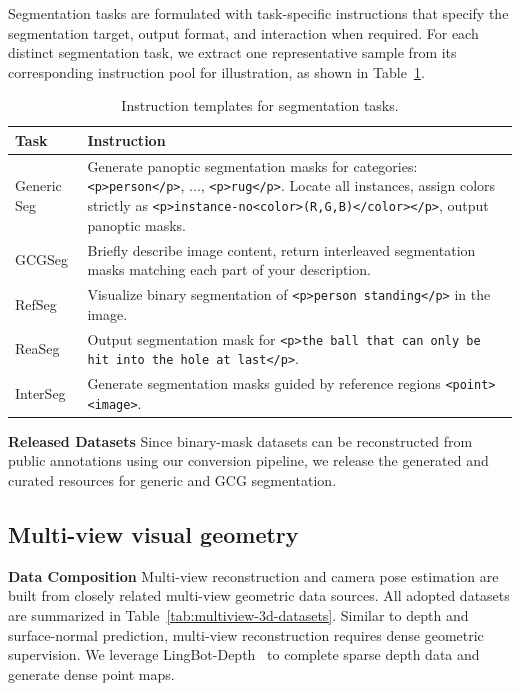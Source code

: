 Segmentation tasks are formulated with task-specific instructions that specify the segmentation target, output format, and interaction when required.
For each distinct segmentation task, we extract one representative sample from its corresponding instruction pool for illustration, as shown in Table~\ref{tab:segmentation-prompt-templates}.

\begin{table}[htbp]
  \centering
  \footnotesize
  \setlength{\tabcolsep}{3pt}
  \renewcommand{\arraystretch}{0.88}
  \begin{tabular}{p{}|p{}}
    \toprule
    Task & Instruction \\
    \midrule
    Generic Seg &
    Generate panoptic segmentation masks for categories: \texttt{<p>person</p>}, ..., \texttt{<p>rug</p>}. Locate all instances, assign colors strictly as \texttt{<p>instance-no<color>(R,G,B)</color></p>}, output panoptic masks. \\
    \midrule
    GCGSeg &
    Briefly describe image content, return interleaved segmentation masks matching each part of your description. \\
    \midrule
    RefSeg &
    Visualize binary segmentation of \texttt{<p>person standing</p>} in the image. \\
    \midrule
    ReaSeg &
    Output segmentation mask for \texttt{<p>the ball that can only be hit into the hole at last</p>}. \\
    \midrule
    InterSeg &
    Generate segmentation masks guided by reference regions \texttt{<point><image>}. \\
    \bottomrule
  \end{tabular}
  \caption{Instruction templates for segmentation tasks.}
  \label{tab:segmentation-prompt-templates}
\end{table}

\textbf{Released Datasets}
Since binary-mask datasets can be reconstructed from public annotations using our conversion pipeline, we release the generated and curated resources for generic and GCG segmentation.

\subsection{Multi-view visual geometry}
\textbf{Data Composition}
Multi-view reconstruction and camera pose estimation are built from closely related multi-view geometric data sources.
All adopted datasets are summarized in Table~\ref{tab:multiview-3d-datasets}.
Similar to depth and surface-normal prediction, multi-view reconstruction requires dense geometric supervision.
We leverage LingBot-Depth~\cite{lingbotdepth} to complete sparse depth data and generate dense point maps.

